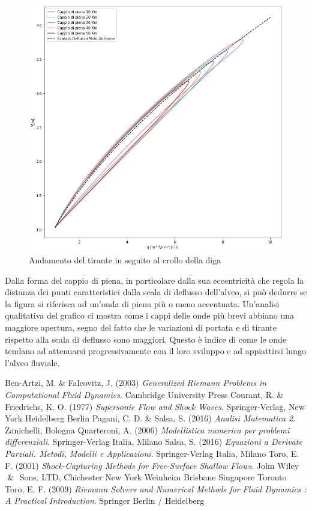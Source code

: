 \documentclass[12pt]{article} %
\begin{document}
\begin{figure} [H]
    \centering
    \includegraphics[scale=0.5,width=18cm]{Cappio.png}
    \caption{Andamento del tirante in seguito al crollo della diga}
    \label{fig:cappio}
\end{figure}

\noindent Dalla forma del cappio di piena, in particolare dalla sua eccentricità che regola la distanza dei punti caratteristici dalla scala di deflusso dell'alveo, si può dedurre se la figura si riferisca ad un'onda di piena più o meno accentuata.
Un'analisi qualitativa del grafico ci mostra come i cappi delle onde più brevi abbiano una maggiore apertura, segno del fatto che le variazioni di portata e di tirante rispetto alla scala di deflusso sono maggiori. Questo è indice di come le onde tendano ad attenuarsi progressivamente con il loro sviluppo e ad appiattirsi lungo l'alveo fluviale.

\newpage
\begin{thebibliography}{}
Ben-Artzi, M. \& Falcovitz, J. (2003) \textit{Generalized Riemann Problems in Computational Fluid Dynamics}. Cambridge University Press
Courant, R. \& Friedrichs, K. O. (1977) \textit{Supersonic Flow and Shock Waves}. Springer-Verlag, New York Heidelberg Berlin
Pagani, C. D. \& Salsa, S. (2016) \textit{Analisi Matematica 2}. Zanichelli, Bologna
Quarteroni, A. (2006) \textit{Modellistica numerica per problemi differenziali}. Springer-Verlag Italia, Milano
Salsa, S. (2016) \textit{Equazioni a Derivate Parziali. Metodi, Modelli e Applicazioni}. Springer-Verlag Italia, Milano
Toro, E. F. (2001) \textit{Shock-Capturing Methods for Free-Surface Shallow Flows}. John Wiley $\And$ Sons, LTD, Chichester New York Weinheim Brisbane Singapore Toronto
Toro, E. F. (2009) \textit{Riemann Solvers and Numerical Methods for Fluid Dynamics : A Practical Introduction}. Springer Berlin / Heidelberg 
\end{thebibliography}
\end{document}
